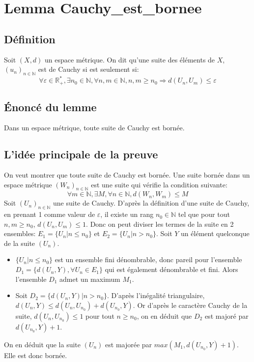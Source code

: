 \section{Lemma Cauchy\_est\_bornee}
\subsection{Définition}
Soit $(X,d)$ un espace métrique. On dit qu'une suite des éléments de $X$, $(u_n)_{n\in \mathbb{N}}$ est de Cauchy si est seulement si: $$\forall \varepsilon \in \mathbb{R_+^*}, \exists n_0 \in \mathbb{N}, \forall n,m \in \mathbb{N}, n,m \geq n_0 \Rightarrow d(U_n,U_m) \leq \varepsilon$$ 
\subsection{\'Enoncé du lemme}
Dans un espace métrique, toute suite de Cauchy est bornée.

\subsection{L'idée principale de la preuve}
On veut montrer que toute suite de Cauchy est bornée. Une suite bornée dans un espace métrique $(W_n)_{n\in\mathbb{N}}$ est une suite qui vérifie la condition suivante:$$ \forall m \in \mathbb{N}, \exists M , \forall n \in \mathbb{N}, d(W_n,W_m)\leq M $$
Soit $(U_n)_{n\in\mathbb{N}}$ une suite de Cauchy.
D'après la définition d'une suite de Cauchy, en prenant 1 comme valeur de $\varepsilon$, il existe un rang $n_0 \in \mathbb{N}$ tel que pour tout $n,m \geq n_0$, $d(U_n,U_m)\leq 1$. Donc on peut diviser les termes de la suite en 2 ensembles: $E_1=\big\{U_n|n\leq n_0 \big\}$ et $E_2=\big\{U_n|n > n_0 \big\}$.
Soit $Y$ un élément quelconque de la suite $(U_n)$.
\begin{itemize}
    \item $\big\{U_n|n\leq n_0 \big\}$ est un ensemble fini dénombrable, donc pareil pour l'ensemble $D_1=\big\{d(U_n,Y), \forall U_n\in E_1\big\}$ qui est également dénombrable et fini. Alors l'ensemble $D_1$ admet un maximum $M_1$.
    \item Soit $D_2=\big\{d(U_n,Y)|n> n_0 \big\}$. D'après l'inégalité triangulaire, $d(U_n,Y)\leq d(U_n,U_{n_0})+d(U_{n_0},Y)$. Or d'après le caractère Cauchy de la suite, $d(U_n,U_{n_0})\leq 1$ pour tout $n\geq n_0$, on en déduit que $D_2$ est majoré par $d(U_{n_0},Y)+1$. 
\end{itemize}
On en déduit que la suite $(U_n)$ est majorée par $max(M_1,d(U_{n_0},Y)+1)$. Elle est donc bornée.\\



